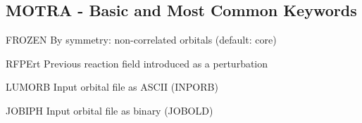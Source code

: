 \subsection{MOTRA - Basic and Most Common Keywords}
\begin{keywordlist}
\item[FROZEN] By symmetry: non-correlated orbitals (default: core)
\item[RFPErt] Previous reaction field introduced as a perturbation
\item[LUMORB] Input orbital file as ASCII (INPORB)
\item[JOBIPH] Input orbital file as binary (JOBOLD)
\item[]

\end{keywordlist}

